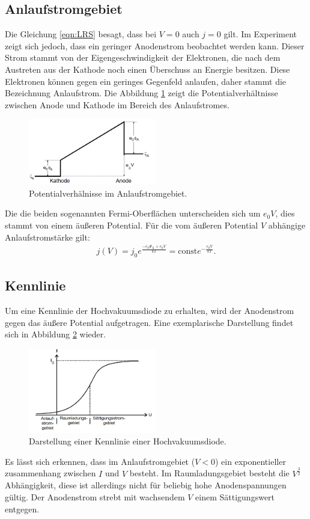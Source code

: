 \subsection{Anlaufstromgebiet}
Die Gleichung \eqref{eqn:LRS} besagt, dass bei $V=0$ auch $j=0$ gilt. Im Experiment zeigt sich jedoch,
dass ein geringer Anodenstrom beobachtet werden kann. Dieser Strom stammt von der Eigengeschwindigkeit
der Elektronen, die nach dem Austreten aus der Kathode noch einen Überschuss an Energie besitzen.
Diese Elektronen können gegen ein geringes Gegenfeld anlaufen, daher stammt die Bezeichnung Anlaufstrom.
Die Abbildung \ref{fig:pv} zeigt die Potentialverhältnisse zwischen Anode und Kathode im Bereich des Anlaufstromes.
\begin{figure}
 \centering
 \includegraphics[width=0.5\textwidth]{pv.png}
 \caption{Potentialverhälnisse im Anlaufstromgebiet.\cite{sample}}
 \label{fig:pv}
 \end{figure}
Die die beiden sogenannten Fermi-Oberflächen unterscheiden sich um $e_\mathrm{0}V$, dies stammt von einem
äußeren Potential. Für die vom äußeren Potential $V$  abhängige Anlaufstromstärke gilt:
\begin{align}
j(V)=j_\mathrm{0}e^{\frac{-e_\mathrm{0}\Phi_\mathrm{A}+e_\mathrm{0}V}{kT}}=\mathrm{const}e^{-\frac{e_\mathrm{0}V}{kT}}\label{eqn:pot}.
\end{align}

\subsection{Kennlinie}
Um eine Kennlinie der Hochvakuumsdiode zu erhalten, wird der Anodenstrom gegen das äußere Potential
aufgetragen. Eine exemplarische Darstellung findet sich in Abbildung \ref{fig:kennlinie} wieder.
\begin{figure}
 \centering
 \includegraphics[width=0.5\textwidth]{kennlinie.png}
 \caption{Darstellung einer Kennlinie einer Hochvakuumsdiode.\cite{sample}}
 \label{fig:kennlinie}
 \end{figure}
Es lässt sich erkennen, dass im Anlaufstromgebiet ($V<0$) ein exponentieller zusammenhang
zwischen $I$ und $V$ besteht. Im Raumladungsgebiet besteht die $V^{\frac{3}{2}}$ Abhängigkeit, diese ist
allerdings nicht für beliebig hohe Anodenspannungen gültig. Der Anodenstrom strebt mit wachsendem $V$
einem Sättigungswert entgegen. 
